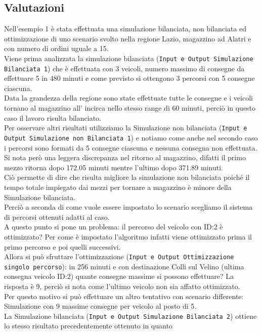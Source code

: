 \documentclass[a4paper,12pt]{report}
\begin{document}
\subsection*{Valutazioni}
Nell'esempio 1 è stata effettuata una simulazione bilanciata, non bilanciata ed
ottimizzazione di uno scenario svolto nella regione Lazio, magazzino ad Alatri e con numero di ordini uguale a 15.\\
Viene prima analizzata la simulazione bilanciata (\texttt{Input e Output Simulazione Bilanciata 1}) che è effettuata con 3 veicoli, numero massimo
di consegne da effettuare 5 in 480 minuti e come previsto si ottengono 3 percorsi con 5 consegne ciascuna.\\
Data la grandezza della regione sono state effettuate tutte le consegne e i veicoli tornano al magazzino
all' incirca nello stesso range di 60 minuti, perciò in questo caso il lavoro risulta bilanciato.\\
Per osservare altri risultati utilizziamo la Simulazione non bilanciata (\texttt{Input e Output Simulazione non Bilanciata 1}) e notiamo come anche nel secondo caso
i percorsi sono formati da 5 consegne ciascuna e nessuna consegna non effettuata.\\
Si nota però una leggera discrepanza nel ritorno al magazzino, difatti il primo mezzo ritorna dopo 
172.05 minuti mentre l'ultimo dopo 371.89 minuti.\\
Ciò permette di dire che risulta migliore la simulazione non bilanciata poiché il tempo
totale impiegato dai mezzi per tornare a magazzino è minore della Simulazione bilanciata.\\
Perciò a seconda di come vuole essere impostato lo scenario scegliamo il sistema di percorsi ottenuti
adatti al caso.\\
A questo punto si pone un problema: il percorso del veicolo con ID:2 è ottimizzato? Per come è impostato l'algoritmo
infatti viene ottimizzato prima il primo percorso e poi quelli successivi.\\
Allora si può sfruttare l'ottimizzazione (\texttt{Input e Output Ottimizzazione singolo percorso}): in 256 minuti e con destinazione Colli sul Velino (ultima
consegna veicolo ID:2) quante consegne massime si possono effettuare?
La risposta è 9, perciò si nota come l'ultimo veicolo non sia affatto ottimizzato.\\
Per questo motivo si può effettuare un altro tentativo con scenario differente: Simulazione 
con 9 massime consegne per veicolo al posto di 5.\\
La Simulazione bilanciata (\texttt{Input e Output Simulazione Bilanciata 2}) ottiene lo stesso risultato precedentemente ottenuto in quanto
\end{document}
